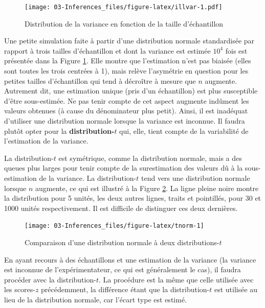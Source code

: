 \documentclass[
]{book}
\begin{document}
\begin{figure}
\centering
\texttt{[image: 03-Inferences\_files/figure-latex/illvar-1.pdf]}
\caption{\label{fig:illvar}Distribution de la variance en fonction de la taille d'échantillon}
\end{figure}

Une petite simulation faite à partir d'une distribution normale standardisée par rapport à trois tailles d'échantillon et dont la variance est estimée \ensuremath{10^{4}} fois est présentée dans la Figure \ref{fig:illvar}. Elle montre que l'estimation n'est pas biaisée (elles sont toutes les trois centrées à 1), mais relève l'asymétrie en question pour les petites tailles d'échantillon qui tend à décroître à mesure que \(n\) augmente. Autrement dit, une estimation unique (pris d'un échantillon) est plus susceptible d'être sous-estimée. Ne pas tenir compte de cet aspect augmente indûment les valeurs obtenues (à cause du dénominateur plus petit). Ainsi, il est inadéquat d'utiliser une distribution normale lorsque la variance est inconnue. Il faudra plutôt opter pour la \textbf{distribution-\(t\)} qui, elle, tient compte de la variabilité de l'estimation de la variance.

La distribution-\(t\) est symétrique, comme la distribution normale, mais a des queues plus larges pour tenir compte de la surestimation des valeurs dû à la sous-estimation de la variance. La distribution-\(t\) tend vers une distribution normale lorsque \(n\) augmente, ce qui est illustré à la Figure \ref{fig:tnorm}. La ligne pleine noire montre la distribution pour 5 unités, les deux autres lignes, traits et pointillés, pour 30 et 1000 unités respectivement. Il est difficile de distinguer ces deux dernières.

\begin{figure}

{\centering \texttt{[image: 03-Inferences\_files/figure-latex/tnorm-1]} 

}

\caption{Comparaison d'une distribution normale à deux distributions-$t$}\label{fig:tnorm}
\end{figure}

En ayant recours à des échantillons et une estimation de la variance (la variance est inconnue de l'expérimentateur, ce qui est généralement le cas), il faudra procéder avec la distribution-\(t\). La procédure est la même que celle utilisée avec les scores-\(z\) précédemment, la différence étant que la distribution-\(t\) est utilisée au lieu de la distribution normale, car l'écart type est estimé.
\end{document}
